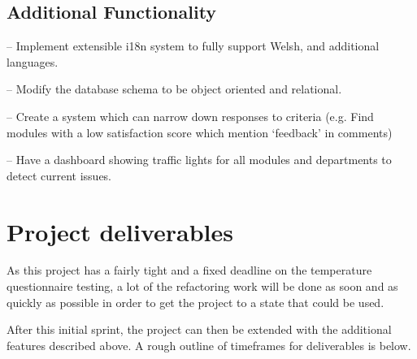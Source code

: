 \documentclass[11pt,fleqn,twoside]{article}
\begin{document}
\subsection{Additional Functionality}
\begin{description}[itemindent=-2em,leftmargin=4em]
	\item[Internationalisation (i18n)] -- Implement extensible i18n system to fully support Welsh, and additional languages.
	\item[Relational Database] -- Modify the database schema to be object oriented and relational.
	\item[Advanced Analytics] -- Create a system which can narrow down responses to criteria (e.g. Find modules with a low satisfaction score which mention `feedback' in comments)
	\item[Traffic Light Dashboard] -- Have a dashboard showing traffic lights for all modules and departments to detect current issues.
\end{description}


\section{Project deliverables}

As this project has a fairly tight and a fixed deadline on the temperature questionnaire testing, a lot of the refactoring work will be done as soon and as quickly as possible in order to get the project to a state that could be used.

After this initial sprint, the project can then be extended with the additional features described above.
A rough outline of timeframes for deliverables is below.
\end{document}
